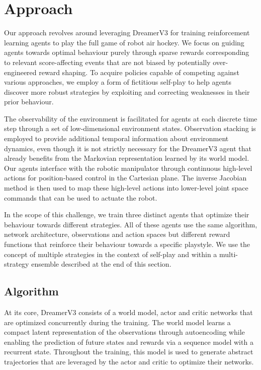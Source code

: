 \documentclass{article}
\begin{document}
\newpage

\section{Approach}\label{sec:approach}

Our approach revolves around leveraging DreamerV3 for training reinforcement learning agents to play the full game of robot air hockey. We focus on guiding agents towards optimal behaviour purely through sparse rewards corresponding to relevant score-affecting events that are not biased by potentially over-engineered reward shaping. To acquire policies capable of competing against various approaches, we employ a form of fictitious self-play to help agents discover more robust strategies by exploiting and correcting weaknesses in their prior behaviour.

The observability of the environment is facilitated for agents at each discrete time step through a set of low-dimensional environment states. Observation stacking is employed to provide additional temporal information about environment dynamics, even though it is not strictly necessary for the DreamerV3 agent that already benefits from the Markovian representation learned by its world model. Our agents interface with the robotic manipulator through continuous high-level actions for position-based control in the Cartesian plane. The inverse Jacobian method is then used to map these high-level actions into lower-level joint space commands that can be used to actuate the robot.

In the scope of this challenge, we train three distinct agents that optimize their behaviour towards different strategies. All of these agents use the same algorithm, network architecture, observations and action spaces but different reward functions that reinforce their behaviour towards a specific playstyle. We use the concept of multiple strategies in the context of self-play and within a multi-strategy ensemble described at the end of this section.

\subsection{Algorithm}\label{ssec:algorithm}

At its core, DreamerV3 consists of a world model, actor and critic networks that are optimized concurrently during the training. The world model learns a compact latent representation of the observations through autoencoding while enabling the prediction of future states and rewards via a sequence model with a recurrent state. Throughout the training, this model is used to generate abstract trajectories that are leveraged by the actor and critic to optimize their networks.
\end{document}
